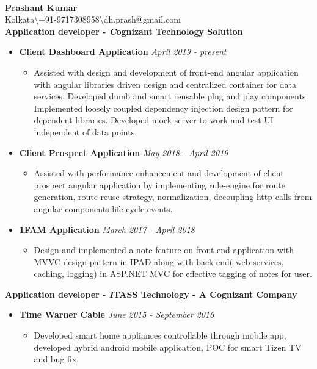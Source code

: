 \documentclass[a4paper,10pt]{article}
\begin{document}
\hspace{0.5cm}\\[-0.2cm]

\textbf{Prashant Kumar} \\
\indent Kolkata\textbackslash +91-9717308958\textbackslash dh.prash@gmail.com \\

\textbf{Application developer - \textit Cognizant Technology Solution}\\
\begin{itemize}
\item[] \textbf {Client Dashboard Application} \quad \textit{April 2019 - present}
    \begin{itemize}
        \item [] Assisted with design and development of front-end angular application  with angular libraries driven design and centralized container for data services. Developed dumb and smart reusable plug and play components. Implemented loosely coupled dependency injection design pattern for dependent libraries. Developed mock server to work and test UI independent of data points.
    \end{itemize}
\item[] \textbf {Client Prospect Application} \quad \textit{May 2018 - April 2019}
    \begin{itemize}
        \item [] Assisted with performance enhancement and development of client prospect angular application by implementing rule-engine for route generation, route-reuse strategy, normalization, decoupling http calls from angular components life-cycle events.
    \end{itemize}
\quad \item[] \textbf {1FAM Application} \quad \textit{March 2017 - April 2018}
    \begin{itemize}
        \item [] Design and implemented a note feature on front end application with MVVC design pattern in IPAD along with back-end( web-services,  caching, logging) in ASP.NET MVC for effective tagging of notes for user.
    \end{itemize}
\end{itemize}

\textbf{Application developer - \textit ITASS Technology - A Cognizant Company}\\
    \begin{itemize}
\item[] \textbf {Time Warner Cable} \quad \textit{June 2015 - September 2016}
    \begin{itemize}
        \item [] Developed smart home appliances controllable through mobile app, developed hybrid android mobile application, POC for smart Tizen TV and bug fix.
    \end{itemize}
\end{itemize}
\end{document}
